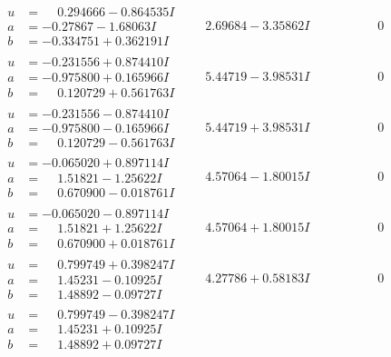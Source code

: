 \documentclass[1p]{elsarticle_modified}
\theoremstyle{definition}
\begin{document}
$$\begin{array}{c|c|c}
\begin{aligned}
u &= \phantom{-}0.294666 - 0.864535 I \\
a &= -0.27867 - 1.68063 I \\
b &= -0.334751 + 0.362191 I\end{aligned}
 & \phantom{-}2.69684 - 3.35862 I & \phantom{-0.000000 } 0 \\ \hline\begin{aligned}
u &= -0.231556 + 0.874410 I \\
a &= -0.975800 + 0.165966 I \\
b &= \phantom{-}0.120729 + 0.561763 I\end{aligned}
 & \phantom{-}5.44719 - 3.98531 I & \phantom{-0.000000 } 0 \\ \hline\begin{aligned}
u &= -0.231556 - 0.874410 I \\
a &= -0.975800 - 0.165966 I \\
b &= \phantom{-}0.120729 - 0.561763 I\end{aligned}
 & \phantom{-}5.44719 + 3.98531 I & \phantom{-0.000000 } 0 \\ \hline\begin{aligned}
u &= -0.065020 + 0.897114 I \\
a &= \phantom{-}1.51821 - 1.25622 I \\
b &= \phantom{-}0.670900 - 0.018761 I\end{aligned}
 & \phantom{-}4.57064 - 1.80015 I & \phantom{-0.000000 } 0 \\ \hline\begin{aligned}
u &= -0.065020 - 0.897114 I \\
a &= \phantom{-}1.51821 + 1.25622 I \\
b &= \phantom{-}0.670900 + 0.018761 I\end{aligned}
 & \phantom{-}4.57064 + 1.80015 I & \phantom{-0.000000 } 0 \\ \hline\begin{aligned}
u &= \phantom{-}0.799749 + 0.398247 I \\
a &= \phantom{-}1.45231 - 0.10925 I \\
b &= \phantom{-}1.48892 - 0.09727 I\end{aligned}
 & \phantom{-}4.27786 + 0.58183 I & \phantom{-0.000000 } 0 \\ \hline\begin{aligned}
u &= \phantom{-}0.799749 - 0.398247 I \\
a &= \phantom{-}1.45231 + 0.10925 I \\
b &= \phantom{-}1.48892 + 0.09727 I\end{aligned}

\end{array}$$
\end{document}
